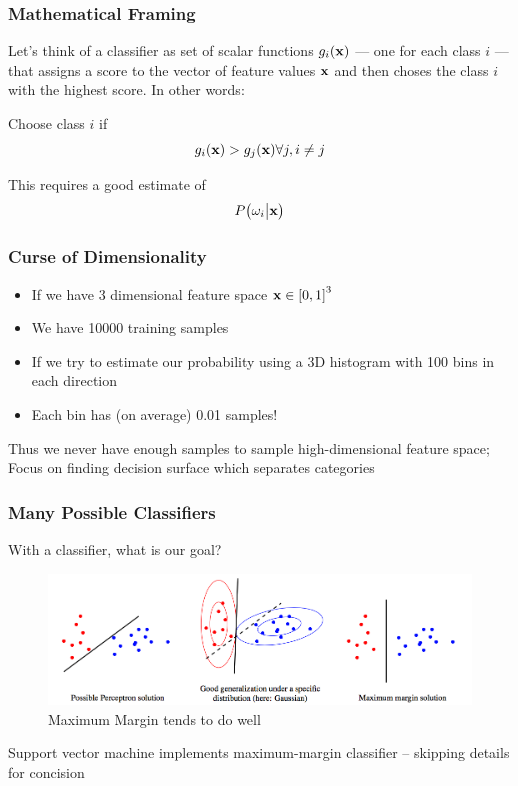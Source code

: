 \documentclass[10pt]{beamer}
\begin{document}
\begin{frame}
	\frametitle{Mathematical Framing}
	Let's think of a classifier as set of scalar functions $g_i(\vb{x})$ — one for each class $i$ — that assigns a score to the vector of feature values $\vb{x}$ and then choses the class $i$ with the highest score.
	In other words:
	\begin{exampleblock}{Choose class $i$ if}
		\begin{equation}
			g_i(\vb{x}) > g_j(\vb{x}) \forall j, i \neq j
		\end{equation}
	\end{exampleblock}
	This requires a good estimate of
	\[P \qty(\omega_i \big| \vb{x})\]
\end{frame}

\begin{frame}
	\frametitle{Curse of Dimensionality}
	\begin{itemize}
		\item If we have 3 dimensional feature space $\vb{x} \in \qty[0, 1]^3$
		\item We have 10000 training samples
		\item If we try to estimate our probability using a 3D histogram with 100 bins in each direction
		\item Each bin has (on average) 0.01 samples!
	\end{itemize}
	Thus we never have enough samples to sample high-dimensional feature space; \alert{Focus on finding decision surface which separates categories}
\end{frame}

\begin{frame}
	\frametitle{Many Possible Classifiers}
	With a classifier, what is our goal?
	\begin{figure}
		\includegraphics[width=\textwidth,height=\textheight,keepaspectratio=true]{classifier_possibilities.png}
		\caption{Maximum Margin tends to do well}
		\label{fig:maximum-margin}
	\end{figure}
	Support vector machine implements maximum-margin classifier -- skipping details for concision
\end{frame}
\end{document}
